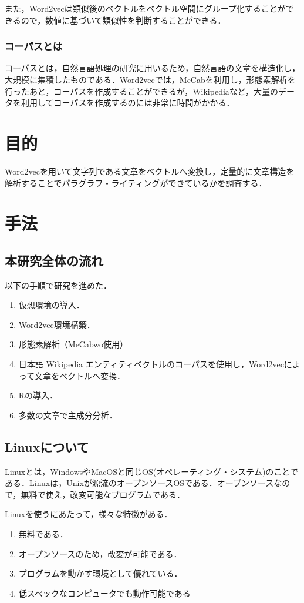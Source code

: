 また，Word2vecは類似後のベクトルをベクトル空間にグループ化することができるので，数値に基づいて類似性を判断することができる．
\subsection{コーパスとは}
コーパスとは，自然言語処理の研究に用いるため，自然言語の文章を構造化し，大規模に集積したものである．Word2vecでは，MeCabを利用し，形態素解析を行ったあと，コーパスを作成することができるが，Wikipediaなど，大量のデータを利用してコーパスを作成するのには非常に時間がかかる．
\newpage

\chapter{目的}
Word2vecを用いて文字列である文章をベクトルへ変換し，定量的に文章構造を解析することでパラグラフ・ライティングができているかを調査する．
\newpage

\chapter{手法}
\section{本研究全体の流れ}
以下の手順で研究を進めた．
\begin{enumerate}
 \item 仮想環境の導入．
 \item Word2vec環境構築．
 \item 形態素解析（MeCabwo使用）
 \item 日本語 Wikipedia エンティティベクトルのコーパスを使用し，Word2vecによって文章をベクトルへ変換．
 \item Rの導入．
 \item 多数の文章で主成分分析．
\end{enumerate}
\newpage

\section{Linuxについて}
Linuxとは，WindowsやMacOSと同じOS(オペレーティング・システム)のことである．Linuxは，Unixが源流のオープンソースOSである．オープンソースなので，無料で使え，改変可能なプログラムである．

Linuxを使うにあたって，様々な特徴がある．
\begin{enumerate}
 \item 無料である．
 \item オープンソースのため，改変が可能である．
 \item プログラムを動かす環境として優れている．
 \item 低スペックなコンピュータでも動作可能である
\end{enumerate}
\newpage

